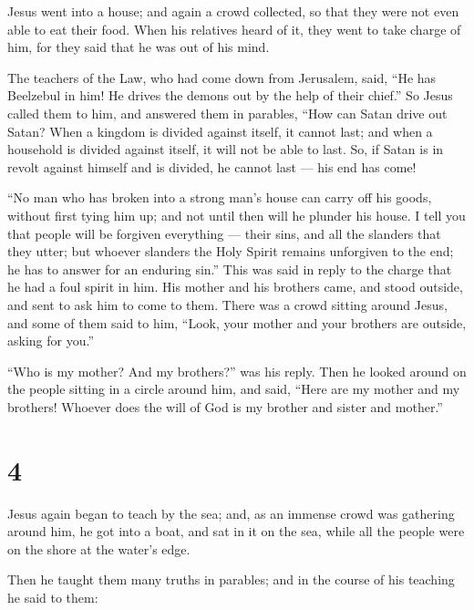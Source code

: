  Jesus went into a house; and again a crowd collected, so
that they were not even able to eat their food.  When his
relatives heard of it, they went to take charge of him, for they said
that he was out of his mind.

 The teachers of the Law, who had come down from Jerusalem,
said, ``He has Beelzebul in him! He drives the demons out by the help of
their chief.''  So Jesus called them to him, and answered
them in parables, ``How can Satan drive out Satan?  When a
kingdom is divided against itself, it cannot last;  and
when a household is divided against itself, it will not be able to last.
 So, if Satan is in revolt against himself and is divided,
he cannot last --- his end has come!

 ``No man who has broken into a strong man's house can
carry off his goods, without first tying him up; and not until then will
he plunder his house.  I tell you that people will be
forgiven everything --- their sins, and all the slanders that they
utter;  but whoever slanders the Holy Spirit remains
unforgiven to the end; he has to answer for an enduring sin.''
 This was said in reply to the charge that he had a foul
spirit in him.  His mother and his brothers came, and stood
outside, and sent to ask him to come to them.  There was a
crowd sitting around Jesus, and some of them said to him, ``Look, your
mother and your brothers are outside, asking for you.''

 ``Who is my mother? And my brothers?'' was his reply.
 Then he looked around on the people sitting in a circle
around him, and said, ``Here are my mother and my brothers!
 Whoever does the will of God is my brother and sister and
mother.''

\hypertarget{section-3}{%
\section{4}\label{section-3}}

 Jesus again began to teach by the sea; and, as an immense
crowd was gathering around him, he got into a boat, and sat in it on the
sea, while all the people were on the shore at the water's edge.

 Then he taught them many truths in parables; and in the
course of his teaching he said to them:

